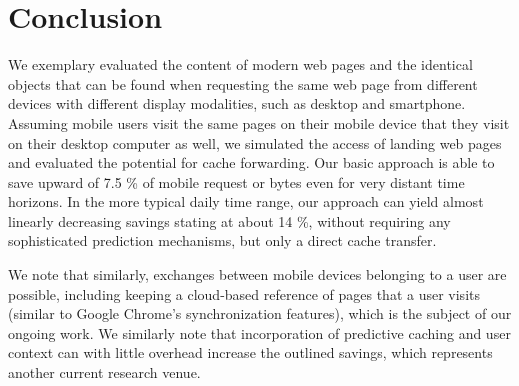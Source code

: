 \documentclass[letterpaper,conference]{IEEEtran}
\begin{document}
\section{Conclusion}
We exemplary evaluated the content of modern web pages and the identical objects that can be found when requesting the same web page from different devices with different display modalities, such as desktop and smartphone.
Assuming mobile users visit the same pages on their mobile device that they visit on their desktop computer as well, we simulated the access of landing web pages and evaluated the potential for cache forwarding.
Our basic approach is able to save upward of 7.5 \% of mobile request or bytes even for very distant time horizons.
In the more typical daily time range, our approach can yield almost linearly decreasing savings stating at about 14 \%, without requiring any sophisticated prediction mechanisms, but only a direct cache transfer.

We note that similarly, exchanges between mobile devices belonging to a user are possible, including keeping a cloud-based reference of pages that a user visits (similar to Google Chrome's synchronization features), which is the subject of our ongoing work. We similarly note that incorporation of predictive caching and user context can with little overhead increase the outlined savings, which represents another current research venue.



\end{document}
